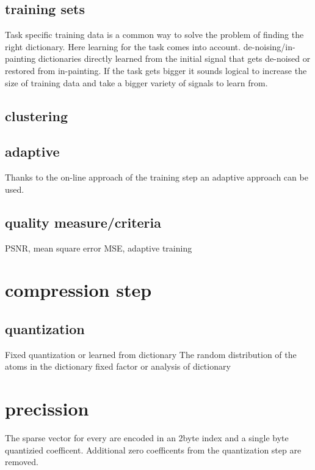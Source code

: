 \subsection{training sets}
Task specific training data is a common way to solve the problem of finding the right dictionary. 
Here learning for the task comes into account. de-noising/in-painting dictionaries directly learned from the initial
signal that gets de-noised or restored from in-painting.
If the task gets bigger it sounds logical to increase the size of training data and take a bigger variety of signals to learn from.

\subsection{clustering}

\subsection{adaptive}
Thanks to the on-line approach of the training step an adaptive approach can be used. 

\subsection{quality measure/criteria}
PSNR, mean square error MSE, adaptive training 

\section{compression step}
\subsection{quantization}
Fixed quantization or learned from dictionary
The random distribution of the atoms in the dictionary 
fixed factor or analysis of dictionary

\section{precission}
The sparse vector for every are encoded in an 2byte index and a single byte quantizied coefficent. Additional zero coefficents from the quantization step are removed.




